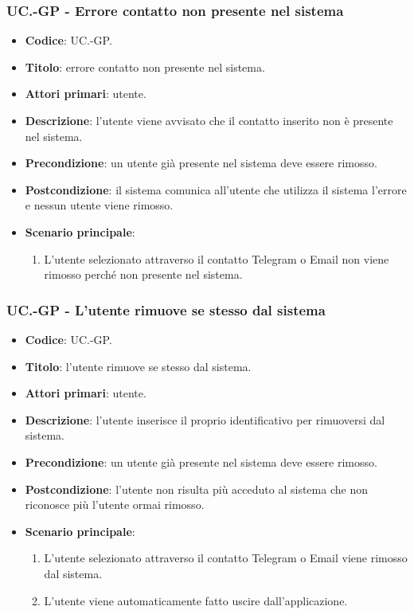 			\subsubsection{UC\theuccount.\thesubuccount-GP - Errore contatto non presente nel sistema}
					
				\begin{itemize}
					\item \textbf{Codice}: UC\theuccount.\thesubuccount-GP.
					\item \textbf{Titolo}: errore contatto non presente nel sistema.
					\item \textbf{Attori primari}: utente.
					\item \textbf{Descrizione}: l’utente viene avvisato che il contatto inserito non è presente nel sistema.
					\item \textbf{Precondizione}: un utente già presente nel sistema deve essere rimosso.
					\item \textbf{Postcondizione}: il sistema comunica all’utente che utilizza il sistema l’errore e nessun utente viene rimosso.
					\item \textbf{Scenario principale}:
					\begin{enumerate}
						\item L'utente selezionato attraverso il contatto Telegram o Email non viene rimosso perché non presente nel sistema.
					\end{enumerate}
				\end{itemize}
			
			\subsubsection{UC\theuccount.\thesubuccount-GP - L'utente rimuove se stesso dal sistema}
			
			\begin{itemize}
				\item \textbf{Codice}: UC\theuccount.\thesubuccount-GP.
				\item \textbf{Titolo}: l'utente rimuove se stesso dal sistema.
				\item \textbf{Attori primari}: utente.
				\item \textbf{Descrizione}:  l’utente inserisce il proprio identificativo per rimuoversi dal sistema.
				\item \textbf{Precondizione}: un utente già presente nel sistema deve essere rimosso.
				\item \textbf{Postcondizione}: l'utente non risulta più acceduto al sistema che non riconosce più l'utente ormai rimosso.
				\item \textbf{Scenario principale}:
				\begin{enumerate}
					\item L'utente selezionato attraverso il contatto Telegram o Email viene rimosso dal sistema.
					\item L'utente viene automaticamente fatto uscire dall'applicazione.
				\end{enumerate}
			\end{itemize}